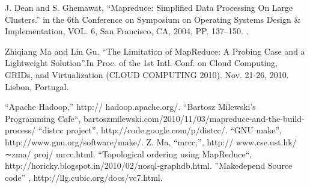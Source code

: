 \cleardoublepage
{}
{}

\begin{thebibliography}{99}

 J. Dean and S. Ghemawat, “Mapreduce: Simplified Data Processing On Large Clusters.”  in the 6th Conference on Symposium on Operating Systems Design \& Implementation, VOL. 6,
San Francisco, CA, 2004, PP. 137–150.
.

 Zhiqiang Ma and Lin Gu. ``The Limitation of MapReduce: A Probing Case and a Lightweight Solution''.In Proc. of the 1st Intl. Conf. on Cloud Computing, GRIDs, and
Virtualization (CLOUD COMPUTING 2010). Nov. 21-26, 2010. Lisbon, Portugal.


 “Apache Hadoop,” http:// hadoop.apache.org/.
 ``Bartosz Milewski's Programming Cafe``, bartoszmilewski.com/2010/11/03/mapreduce-and-the-build-process/
 “distcc project”, http://code.google.com/p/distcc/.
 “GNU make'', http://www.gnu.org/software/make/.
 Z. Ma, “mrcc,”, http:// www.cse.ust.hk/ ∼zma/ proj/ mrcc.html.
 ``Topological ordering using MapReduce``, http://horicky.blogspot.in/2010/02/nosql-graphdb.html.
 ''Makedepend Source code'' , http://llg.cubic.org/docs/vc7.html.

\end{thebibliography}
